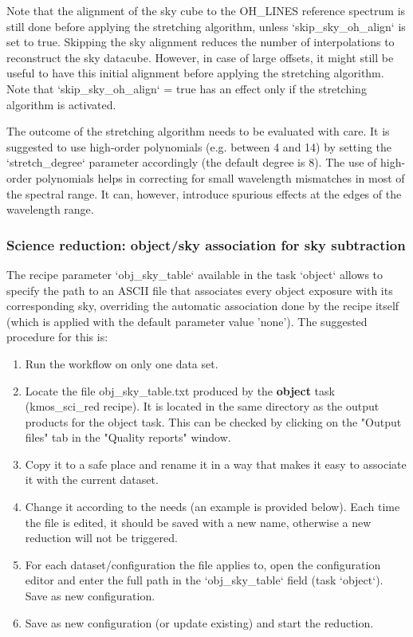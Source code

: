 Note that the alignment of the sky cube to the OH\_LINES reference spectrum is still done before applying the
stretching algorithm, unless `skip\_sky\_oh\_align` is set to true. Skipping the sky alignment reduces
the number of interpolations to reconstruct the sky datacube. However, in case of large offsets, it might still
be useful to have this initial alignment before applying the stretching algorithm. Note that 
`skip\_sky\_oh\_align` = true has an effect only if the stretching algorithm is activated.

The outcome of the stretching algorithm needs to be evaluated with care. It is suggested to use high-order
polynomials (e.g. between 4 and 14) by setting the `stretch\_degree` parameter accordingly (the default
degree is 8). The use of high-order polynomials helps in correcting for small wavelength mismatches in most of
the spectral range. It can, however, introduce spurious effects at the edges of the wavelength range.



\subsubsection{Science reduction: object/sky association for sky subtraction}

The recipe parameter `obj\_sky\_table` available in the task `object` allows to specify the path to an ASCII file that
associates every object exposure with its corresponding sky, overriding the automatic association done by the
recipe itself (which is applied with the default parameter value 'none'). The suggested procedure for this is:


\begin{enumerate}
\item Run the workflow on only one data set.
\item Locate the file obj\_sky\_table.txt produced by the \textbf{object} task (kmos\_sci\_red recipe). It is located in the same directory as the output products for the object task. This can be checked by clicking on the "Output files" tab in the "Quality reports" window.
\item Copy it to a safe place and rename it in a way that makes it easy to associate it with the current dataset.
\item Change it according to the needs (an example is provided below). Each time the file is edited, it should
be saved with a new name, otherwise a new reduction will not be triggered.
\item For each dataset/configuration the file applies to, open the configuration editor and enter the full path in the 
   `obj\_sky\_table` field (task `object`). Save as new configuration.
\item Save as new configuration (or update existing) and start the reduction.
\end{enumerate}

